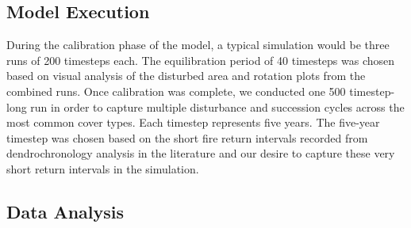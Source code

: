 \subsection{Model Execution}
During the calibration phase of the model, a typical simulation would be three runs of 200 timesteps each. The equilibration period of 40 timesteps was chosen based on visual analysis of the disturbed area and rotation plots from the combined runs. Once calibration was complete, we conducted one 500 timestep-long run in order to capture multiple disturbance and succession cycles across the most common cover types. Each timestep represents five years. The five-year timestep was chosen based on the short fire return intervals recorded from dendrochronology analysis in the literature and our desire to capture these very short return intervals in the simulation.

\subsection{Data Analysis}
\label{subsec:dataanalysis}

